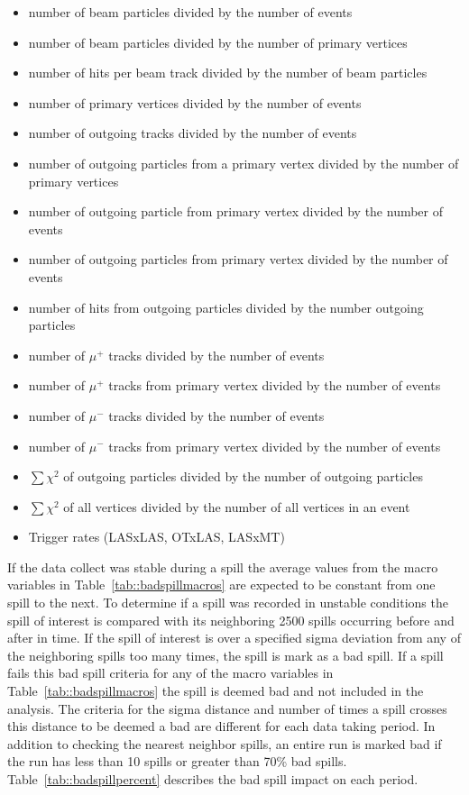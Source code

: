 \begin{itemize}
  \label{tab::badspillmacros}
\item number of beam particles divided by the number of events
\item number of beam particles divided by the number of primary vertices
\item number of hits per beam track divided by the number of beam particles
\item number of primary vertices divided by the number of events
\item number of outgoing tracks divided by the number of events
\item number of outgoing particles from a primary vertex divided by the number
  of primary vertices
\item number of outgoing particle from primary vertex divided by the number of
  events
\item number of outgoing particles from primary vertex divided by the number of
  events
\item number of hits from outgoing particles divided by the number outgoing
  particles
\item number of $\mu^+$ tracks divided by the number of events
\item number of $\mu^+$ tracks from primary vertex divided by the number of
  events
\item number of $\mu^-$ tracks divided by the number of events
\item number of $\mu^-$ tracks from primary vertex divided by the number of
  events
\item $\sum \chi^2$ of outgoing particles divided by the number of outgoing
  particles
\item $\sum \chi^2$ of all vertices divided by the number of all vertices in an
  event
\item Trigger rates (LASxLAS, OTxLAS, LASxMT)
\end{itemize}

If the data collect was stable during a spill the average values from the macro
variables in Table~\ref{tab::badspillmacros} are expected to be constant from
one spill to the next.  To determine if a spill was recorded in unstable
conditions the spill of interest is compared with its neighboring 2500 spills
occurring before and after in time.  If the spill of interest is over a
specified sigma deviation from any of the neighboring spills too many times, the
spill is mark as a bad spill.  If a spill fails this bad spill criteria for any
of the macro variables in Table~\ref{tab::badspillmacros} the spill is deemed
bad and not included in the analysis.  The criteria for the sigma distance and
number of times a spill crosses this distance to be deemed a bad are different
for each data taking period.  In addition to checking the nearest neighbor
spills, an entire run is marked bad if the run has less than 10
spills or greater than 70\% bad spills.  Table~\ref{tab::badspillpercent}
describes the bad spill impact on each period. \par

